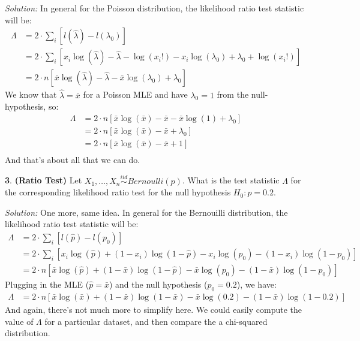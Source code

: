 \documentclass{tufte-handout}
\newcommand{\iid}{\stackrel{iid}{\sim}}
\begin{document}
\textit{Solution:} In general for the Poisson distribution, the likelihood ratio test statistic
will be:
\begin{align*}
\Lambda &= 2 \cdot \sum_i \left[ l(\hat{\lambda}) - l(\lambda_0)  \right] \\
&= 2 \cdot \sum_i \left[ x_i \log(\hat{\lambda}) - \hat{\lambda} - \log(x_i!) - 
                         x_i \log(\lambda_0) + \lambda_0 + \log(x_i!)  \right] \\
&= 2 \cdot n \left[ \bar{x} \log(\hat{\lambda}) - \hat{\lambda} - \bar{x} \log(\lambda_0) + \lambda_0 \right] 
\end{align*}
We know that $\hat{\lambda} = \bar{x}$ for a Poisson MLE and have $\lambda_0 = 1$
from the null-hypothesis, so:
\begin{align*}
\Lambda
&= 2 \cdot n \left[ \bar{x} \log(\bar{x}) - \bar{x} - \bar{x} \log(1) + \lambda_0 \right] \\ 
&= 2 \cdot n \left[ \bar{x} \log(\bar{x}) - \bar{x} + \lambda_0 \right] \\ 
&= 2 \cdot n \left[ \bar{x} \log(\bar{x}) - \bar{x} + 1 \right] \\ 
\end{align*}
And that's about all that we can do. 

\textbf{3}. \textbf{(Ratio Test)} Let $X_1, \ldots, X_n \iid Bernoulli(p)$.
What is the test statistic $\Lambda$ for the corresponding likelihood 
ratio test for the null hypothesis $H_0: p = 0.2$.

\textit{Solution:} One more, same idea. In general for the Bernouilli distribution, the likelihood
ratio test statistic will be:
\begin{align*}
\Lambda
&= 2 \cdot \sum_i \left[ l(\hat{p}) - l(p_0)  \right] \\
&= 2 \cdot \sum_i \left[ x_i \log(\hat{p}) + (1-x_i) \log(1 - \hat{p}) -
                         x_i \log(p_0) - (1-x_i) \log(1 - p_0) \right] \\
&= 2 \cdot n \left[ \bar{x} \log(\hat{p}) + (1-\bar{x}) \log(1 - \hat{p}) -
                    \bar{x} \log(p_0) - (1-\bar{x}) \log(1 - p_0) \right]                       
\end{align*}
Plugging in the MLE ($\hat{p} = \bar{x}$) and the null hypothesis ($p_0 = 0.2$),
we have:
\begin{align*}
\Lambda
&= 2 \cdot n \left[ \bar{x} \log(\bar{x}) + (1-\bar{x}) \log(1 - \bar{x}) -
                    \bar{x} \log(0.2) - (1-\bar{x}) \log(1 - 0.2) \right]                       
\end{align*}
And again, there's not much more to simplify here. We could easily compute
the value of $\Lambda$ for a particular dataset, and then compare the a 
chi-squared distribution.
\end{document}
